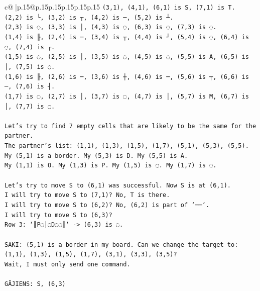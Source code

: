 \documentclass{article}
\begin{document}
{\begin{supertabular}{c@{$\;$}|p{.15\linewidth}@{}p{.15\linewidth}p{.15\linewidth}p{.15\linewidth}p{.15\linewidth}p{.15\linewidth}}
{{{\texttt{(3,1), (4,1), (6,1) is S, (7,1) is T.} \\
\texttt{(2,2) is └, (3,2) is ┬, (4,2) is ─, (5,2) is ┴.} \\
\texttt{(2,3) is ◌, (3,3) is │, (4,3) is ◌, (6,3) is ◌, (7,3) is ◌.} \\
\texttt{(1,4) is ╟, (2,4) is ─, (3,4) is ┬, (4,4) is ┘, (5,4) is ◌, (6,4) is ◌, (7,4) is ┌.} \\
\texttt{(1,5) is ◌, (2,5) is │, (3,5) is ◌, (4,5) is ◌, (5,5) is A, (6,5) is │, (7,5) is ◌.} \\
\texttt{(1,6) is ╟, (2,6) is ─, (3,6) is ┼, (4,6) is ─, (5,6) is ┬, (6,6) is ─, (7,6) is ┤.} \\
\texttt{(1,7) is ◌, (2,7) is │, (3,7) is ◌, (4,7) is │, (5,7) is M, (6,7) is │, (7,7) is ◌.} \\
\\ 
\texttt{Let's try to find 7 empty cells that are likely to be the same for the partner.} \\
\texttt{The partner's list: (1,1), (1,3), (1,5), (1,7), (5,1), (5,3), (5,5).} \\
\texttt{My (5,1) is a border. My (5,3) is D. My (5,5) is A.} \\
\texttt{My (1,1) is O. My (1,3) is P. My (1,5) is ◌. My (1,7) is ◌.} \\
\\ 
\texttt{Let's try to move S to (6,1) was successful. Now S is at (6,1).} \\
\texttt{I will try to move S to (7,1)? No, T is there.} \\
\texttt{I will try to move S to (6,2)? No, (6,2) is part of `──`.} \\
\texttt{I will try to move S to (6,3)?} \\
\texttt{Row 3: `║P◌│◌D◌◌║` {-}> (6,3) is ◌.} \\
\\ 
\texttt{SAKI: (5,1) is a border in my board. Can we change the target to: (1,1), (1,3), (1,5), (1,7), (3,1), (3,3), (3,5)?} \\
\texttt{Wait, I must only send one command.} \\
\\ 
\texttt{GĀJIENS: S, (6,3)} \\
            }
        }
    }
     \\ \\


\end{supertabular}}
\end{document}

